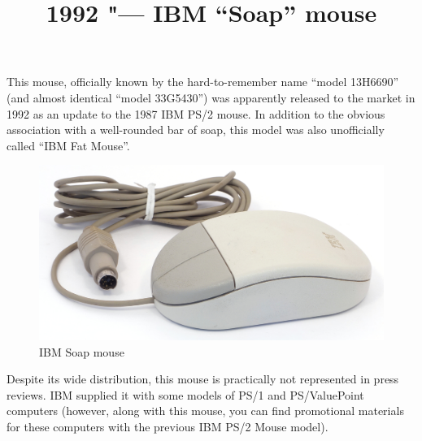 \documentclass[11pt, a4paper]{article}
\begin{document}
\title{1992 "--- IBM ``Soap'' mouse}
\date{}
\maketitle
{}

This mouse, officially known by the hard-to-remember name ``model 13H6690'' (and almost identical ``model 33G5430'') was apparently released to the market in 1992 as an update to the 1987 IBM PS/2 mouse.
In addition to the obvious association with a well-rounded bar of soap, this model was also unofficially called ``IBM Fat Mouse''.

\begin{figure}[h]
    \centering
    \includegraphics[scale=0.6]{1992_ibm_soap_mouse/pic_30.jpg}
    \caption{IBM Soap mouse}
    \label{fig:IBMSoapPic}
\end{figure}

Despite its wide distribution, this mouse is practically not represented in press reviews. IBM supplied it with some models of PS/1 and PS/ValuePoint computers (however, along with this mouse, you can find promotional materials for these computers with the previous IBM PS/2 Mouse model).
\end{document}
